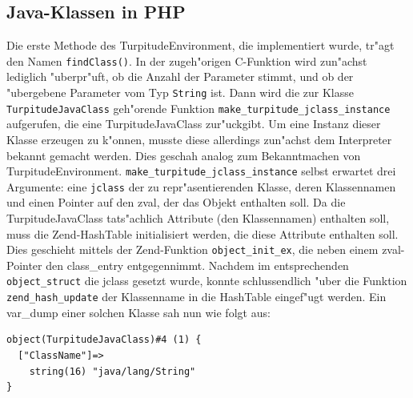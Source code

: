 \subsection{Java-Klassen in PHP}
\label{sec:chap1:impl:4}

Die erste Methode des TurpitudeEnvironment, die implementiert wurde, tr"agt den Namen \texttt{findClass()}. In der zugeh"origen C-Funktion wird zun"achst 
lediglich "uberpr"uft, ob die Anzahl der Parameter stimmt, und ob der "ubergebene Parameter vom Typ \texttt{String} ist. Dann wird die
zur Klasse \texttt{TurpitudeJavaClass} geh"orende Funktion \texttt{make\_turpitude\_jclass\_instance} aufgerufen, die eine TurpitudeJavaClass
zur"uckgibt. Um eine Instanz dieser
Klasse erzeugen zu k"onnen, musste diese allerdings zun"achst dem Interpreter bekannt gemacht werden. Dies geschah analog zum Bekanntmachen
von TurpitudeEnvironment. \texttt{make\_turpitude\_jclass\_instance} selbst erwartet drei Argumente: eine \texttt{jclass} der zu
repr"asentierenden Klasse, deren Klassennamen und einen Pointer auf den zval, der das Objekt enthalten soll. Da die TurpitudeJavaClass 
tats"achlich Attribute (den Klassennamen) enthalten soll, muss die Zend-HashTable initialisiert werden, die diese Attribute enthalten soll.
Dies geschieht mittels der Zend-Funktion \texttt{object\_init\_ex}, die neben einem zval-Pointer den class\_entry entgegennimmt.
Nachdem im entsprechenden \texttt{object\_struct} die jclass gesetzt wurde, konnte schlussendlich "uber die Funktion \texttt{zend\_hash\_update} 
der Klassenname in die HashTable eingef"ugt werden. Ein var\_dump einer solchen Klasse sah nun wie folgt aus:

\begin{lstlisting}[caption=Dump einer TurpitudeJavaClass]
object(TurpitudeJavaClass)#4 (1) {
  ["ClassName"]=>
    string(16) "java/lang/String"
}
\end{lstlisting}

